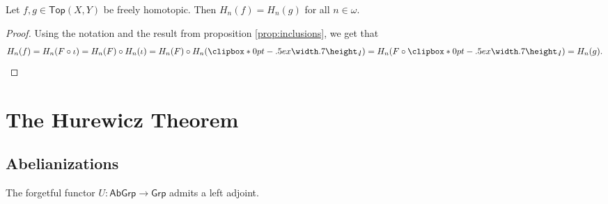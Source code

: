 \begin{theorem}
	Let $f,g \in \mathsf{Top}(X,Y)$ be freely homotopic. Then $H_n(f) = H_n(g)$ for all $n \in \omega$.
\end{theorem}

\begin{proof}
	Using the notation and the result from proposition \ref{prop:inclusions}, we get that
	\begin{align*}
		H_n(f) = H_n(F \circ \iota) = H_n(F) \circ H_n(\iota) = H_n(F) \circ H_n(\jota) = H_n(F \circ \jota) = H_n(g).
	\end{align*}
\end{proof}

\section*{The Hurewicz Theorem}
\subsection*{Abelianizations}

\begin{proposition}
	The forgetful functor $U : \mathsf{AbGrp} \to \mathsf{Grp}$ admits a left adjoint.
	\label{prop:Ab_grp_abgrp}
\end{proposition}

